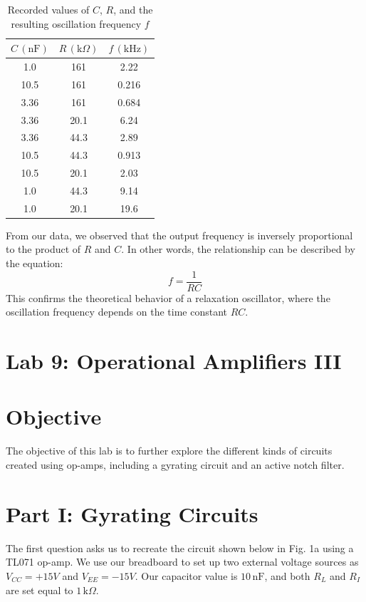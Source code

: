 \documentclass{article}
\begin{document}
\begin{table}[H]
    \centering
    \begin{tabular}{|c|c|c|}
        \hline
        \( C \, (\text{nF}) \) & \( R \, (\text{k}\Omega) \) & \( f \, (\text{kHz}) \) \\
        \hline
        1.0  & 161   & 2.22 \\
        10.5 & 161   & 0.216 \\
        3.36 & 161   & 0.684 \\
        3.36 & 20.1  & 6.24  \\
        3.36 & 44.3  & 2.89  \\
        10.5 & 44.3  & 0.913 \\
        10.5 & 20.1  & 2.03  \\
        1.0  & 44.3  & 9.14  \\
        1.0  & 20.1  & 19.6  \\
        \hline
    \end{tabular}
    \caption{Recorded values of \( C \), \( R \), and the resulting oscillation frequency \( f \)}
\end{table}

From our data, we observed that the output frequency is inversely proportional to the product of \( R \) and \( C \). In other words, the relationship can be described by the equation:
\[
f = \frac{1}{RC}
\]
This confirms the theoretical behavior of a relaxation oscillator, where the oscillation frequency depends on the time constant \( RC \).



\section*{Lab 9: Operational Amplifiers III}

\section*{Objective}
The objective of this lab is to further explore the different kinds of 
circuits created using op-amps, including a gyrating circuit and an 
active notch filter.

\section*{Part I: Gyrating Circuits}
The first question asks us to recreate the circuit shown below in 
Fig. 1a using a TL071 op-amp. We use our breadboard to set up two external 
voltage sources as \( V_{CC} = +15V \) and \( V_{EE} = -15V \). Our 
capacitor value is \( 10\,\text{nF} \), and both \( R_L \) and \( R_I \) 
are set equal to \( 1\,\text{k}\Omega \).
\end{document}

